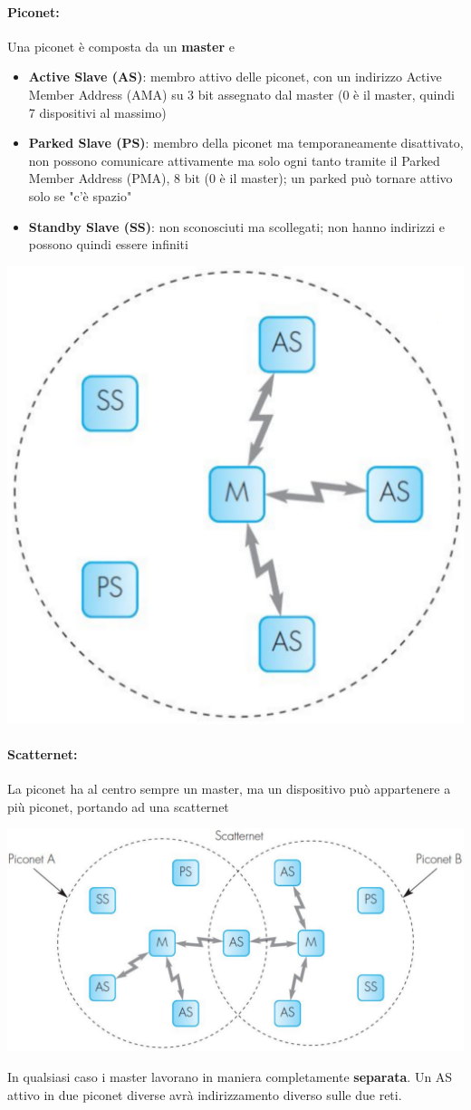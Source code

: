 \paragraph{Piconet:} Una piconet è composta da un \textbf{master} e 
\begin{itemize}
	\item \textbf{Active Slave (AS)}: membro attivo delle piconet, con un indirizzo Active Member Address (AMA) su 3 bit assegnato dal master (0 è il master, quindi 7 dispositivi al massimo)
	\item \textbf{Parked Slave (PS)}: membro della piconet ma temporaneamente disattivato, non possono comunicare attivamente ma solo ogni tanto tramite il Parked Member Address (PMA), 8 bit (0 è il master); un parked può tornare attivo solo se "c'è spazio"
	\item \textbf{Standby Slave (SS)}: non sconosciuti ma scollegati; non hanno indirizzi e possono quindi essere infiniti
\end{itemize}
\begin{center}
	\includegraphics[width=0.35\linewidth]{img/wpan/pico1}
\end{center}

\paragraph{Scatternet:} La piconet ha al centro sempre un master, ma un dispositivo può appartenere a più piconet, portando ad una scatternet
\begin{center}
	\includegraphics[width=0.7\linewidth]{img/wpan/scatter}
\end{center}
In qualsiasi caso i master lavorano in maniera completamente \textbf{separata}. Un AS attivo in due piconet diverse avrà indirizzamento diverso sulle due reti.


